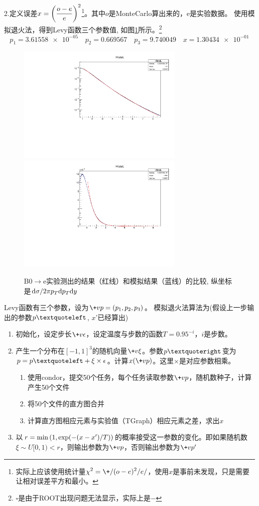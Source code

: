 \documentclass{ctexart}
\begin{document}
\par
2.定义误差$\displaystyle x=\left(\frac{o-e}{e}\right)^2 $\footnote{实际上应该使用统计量$\displaystyle\chi^2=\+/(o-e)^2/e/$，使用$x$是事前未发现，只是需要让相对误差平方和最小。}。其中$o$是MonteCarlo算出来的，e是实验数据。 使用模拟退火法，得到Levy函数三个参数值, 如图\ref{b2e}所示。\footnote{$\square{}$是由于ROOT出现问题无法显示，实际上是$-$}
\[p_1 = \num{3.61558e-05}\quad p_2 = \num{0.669567}\quad p_3 = \num{9.740049}\quad x=\num{1.30434e-01} \]
\begin{figure}[h]\centering
	\includegraphics[width=8cm]{src/b2elog.pdf}
	\includegraphics[width=8cm]{src/b2e.pdf}
	\caption{B0$\to$e实验测出的结果（红线）和模拟结果（蓝线）的比较, 纵坐标是$\mathrm{d} \sigma/2\pi p_T\mathrm{d} p_T\mathrm{d} y$ }
	\label{b2e}
\end{figure}
Levy函数有三个参数，设为$\+vp=(p_1,p_2,p_3)$。
模拟退火法算法为(假设上一步输出的参数$\+vp‘$, $x’$已经算出)
\begin{enumerate}
	\item 初始化，设定步长$\+v\epsilon$，设定温度与步数的函数$T=0.95^{-i}$，$i$是步数。
	\item 产生一个分布在$[-1,1]^3$的随机向量$\+v\xi$。参数$\+vp’$变为$\+vp=\+vp‘+\+v\xi\times\+v\epsilon$。计算$x(\+vp)$。这里$\times$是对应参数相乘。
	\begin{enumerate}
		\item 使用condor，提交50个任务，每个任务读取参数$\+vp$，随机数种子，计算产生50个文件
		\item 将50个文件的直方图合并
		\item 计算直方图相应元素与实验值（TGraph）相应元素之差，求出$x$
	\end{enumerate}
	\item 以$r = \min\left(1,\exp(-(x-x')/T)\right)$的概率接受这一参数的变化。即如果随机数$\xi\sim U[0,1)<r$，则输出参数为$\+vp$，否则输出参数为$\+vp'$
\end{enumerate}
\end{document}
